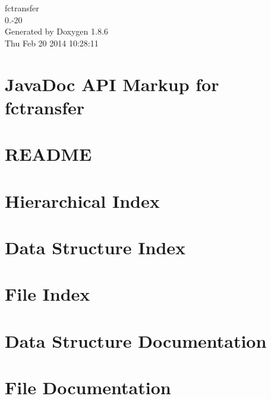 \documentclass[twoside]{book}
\newcommand{\clearemptydoublepage}{%
  \newpage{\pagestyle{empty}\cleardoublepage}%
}
\begin{document}
\begin{titlepage}
\vspace*{7cm}
\begin{center}%
{\Large fctransfer \\[1ex]\large 0.-\/20 }\\
\vspace*{1cm}
{\large Generated by Doxygen 1.8.6}\\
\vspace*{0.5cm}
{\small Thu Feb 20 2014 10:28:11}\\
\end{center}
\end{titlepage}
\clearemptydoublepage
\tableofcontents
\clearemptydoublepage
{}

\chapter{Java\-Doc A\-P\-I Markup for fctransfer}
\label{index}
\chapter{R\-E\-A\-D\-M\-E}
\label{md_htdocs_README}

\chapter{Hierarchical Index}

\chapter{Data Structure Index}

\chapter{File Index}

\chapter{Data Structure Documentation}












\chapter{File Documentation}






\newpage
{}
{}
\printindex
\end{document}
